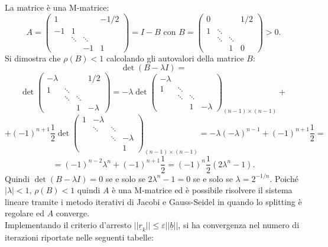 La matrice è una M-matrice:$$A=\begin{pmatrix}1&&&-1/2\\-1&1&&\\&\ddots&\ddots&\\&&-1&1\end{pmatrix}=I-B\mbox{ con }B=\begin{pmatrix}0&&&1/2\\1&\ddots&&\\&\ddots&\ddots&\\&&1&0\end{pmatrix}>0.$$ Si dimostra che $\rho(B)<1$ calcolando gli autovalori della matrice $B$:
    $$\det(B-\lambda I)=$$ $$\det\begin{pmatrix}-\lambda&&&1/2\\1&\ddots&&\\&\ddots&\ddots&\\&&1&-\lambda\end{pmatrix}=-\lambda\det\begin{pmatrix}-\lambda&&&\\1&\ddots&&\\&\ddots&\ddots&\\&&1&-\lambda\end{pmatrix}_{(n-1)\times (n-1)}+$$
    $$+(-1)^{n+1}\frac{1}{2}\det\begin{pmatrix}1&-\lambda &&\\&\ddots&\ddots&\\&&\ddots&-\lambda\\&&&1\end{pmatrix}_{(n-1)\times (n-1)} = -\lambda(-\lambda)^{n-1}+(-1)^{n+1}\frac{1}{2}=$$$$=(-1)^{n-2}\lambda^n+(-1)^{n+1}\frac{1}{2}=(-1)^n\frac{1}{2}(2\lambda^n-1).$$ Quindi $\det(B-\lambda I)=0$
    se e solo se $2\lambda^n-1=0$ se e solo se $\lambda=2^{-1/n}$. Poiché $|\lambda|<1$, $\rho(B)<1$
    quindi $A$ è una M-matrice ed è possibile risolvere il sistema lineare tramite i metodo iterativi di Jacobi e Gauss-Seidel in quando lo splitting è regolare ed $A$ converge.\\
    Implementando il criterio d'arresto $||\underline{r}_k||\leq\varepsilon||\underline{b}||$, si ha convergenza nel numero di iterazioni riportate nelle seguenti tabelle:
    \footnotesize
